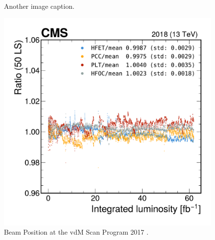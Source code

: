 \begin{figure}[h]
\begin{minipage}{0.48\textwidth}
{    }
    \caption{Another image caption.}
    \label{AnotherImage}
  \end{minipage}
\end{figure}



\begin{figure}[h]
  \hspace{-1.9cm}
  \begin{minipage}{0.48\textwidth}
    \centering
    \includegraphics[scale=.4]{Chapter3/2018_stability/ratio__hfet-pcc-plt-hfocdivmean_PCConly.pdf}
    \raggedleft
    \caption[Doros]{Beam Position at the vdM Scan Program 2017 \cite{lhc_complex}.}
    \label{BeamPosition_2017}
  \end{minipage}
  \hspace{1cm} %
  \begin{minipage}{0.48\textwidth}
    \centering
    \raisebox{0.3cm}{
}
\end{minipage}
\end{figure}
